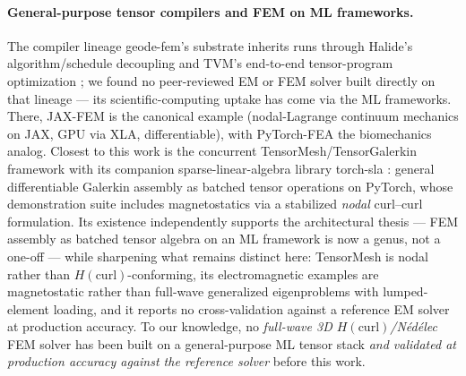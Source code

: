 \documentclass{anvil-paper}
\begin{document}
\paragraph{General-purpose tensor compilers and FEM on ML frameworks.}
The compiler lineage geode-fem's substrate inherits runs through Halide's
algorithm/schedule decoupling \citep{ragankelley2013halide} and TVM's
end-to-end tensor-program optimization \citep{chen2018tvm}; we found no
peer-reviewed EM or FEM solver built directly on that lineage --- its
scientific-computing uptake has come via the ML frameworks. There,
JAX-FEM \citep{xue2023jax} is the canonical example (nodal-Lagrange
continuum mechanics on JAX, GPU via XLA, differentiable), with PyTorch-FEA
\citep{liang2023pytorch} the biomechanics analog. Closest to this work is
the concurrent TensorMesh/TensorGalerkin framework \citep{wen2026learning}
with its companion sparse-linear-algebra library torch-sla
\citep{chi2026torch}: general differentiable Galerkin assembly as batched
tensor operations on PyTorch, whose demonstration suite includes
magnetostatics via a stabilized \emph{nodal} curl--curl formulation. Its
existence independently supports the architectural thesis --- FEM assembly
as batched tensor algebra on an ML framework is now a genus, not a one-off
--- while sharpening what remains distinct here: TensorMesh is nodal
rather than $H(\mathrm{curl})$-conforming, its electromagnetic examples
are magnetostatic rather than full-wave generalized eigenproblems with
lumped-element loading, and it reports no cross-validation against a
reference EM solver at production accuracy. To our knowledge, no
\emph{full-wave 3D $H(\mathrm{curl})$/N\'ed\'elec} FEM solver has been
built on a general-purpose ML tensor stack \emph{and validated at
production accuracy against the reference solver} before this work.
\end{document}
